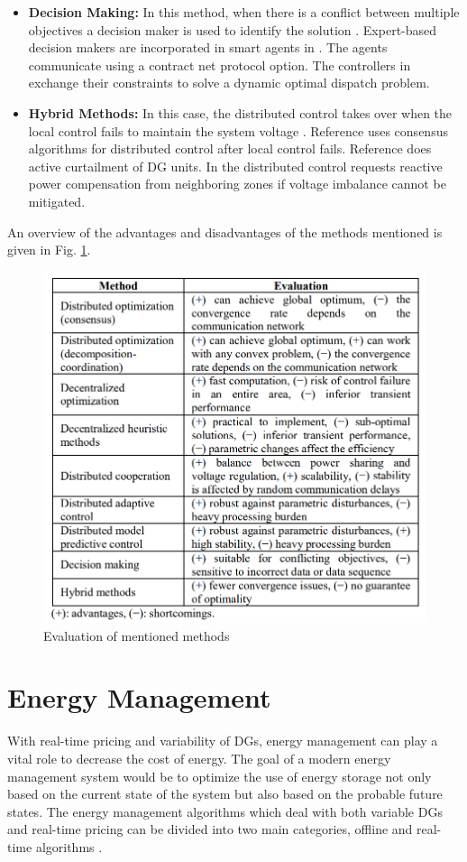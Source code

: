 \begin{itemize}
    \item \textbf{Decision Making:} In this method, when there is a conflict between multiple objectives a decision maker is used to identify the solution \cite{Kyrue}. Expert-based decision makers are incorporated in smart agents in \cite{HEF12, HEF13}. The agents communicate using a contract net protocol option. The controllers in \cite{MEC13} exchange their constraints to solve a dynamic optimal dispatch problem.
    \item \textbf{Hybrid Methods:} In this case, the distributed control takes over when the local control fails to maintain the system voltage \cite{Kyrue}. Reference \cite{GMo13,YWa16} uses consensus algorithms for distributed control after local control fails. Reference \cite{DRe13} does active curtailment of DG units. In \cite{BAR13} the distributed control requests reactive power compensation from neighboring zones if voltage imbalance cannot be mitigated.
\end{itemize}
An overview of the advantages and disadvantages of the methods mentioned is given in Fig. \ref{fig:DIS_CVC}.
\begin{figure}[!h]
\centering
\includegraphics[width=0.85\linewidth]{figs/DIS_CVC.png}
\caption[Evaluation of mentioned methods]{Evaluation of mentioned methods \cite{Kyrue}}
\label{fig:DIS_CVC}
\end{figure}

\section{Energy Management}
With real-time pricing and variability of DGs, energy management can play a vital role to decrease the cost of energy. The goal of a modern energy management system would be to optimize the use of energy storage not only based on the current state of the system but also based on the probable future states. The energy management algorithms which deal with both variable DGs and real-time pricing can be divided into two main categories, offline and real-time algorithms \cite{Wen17}. 
